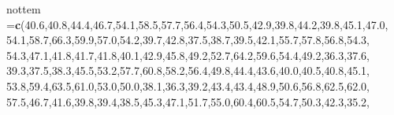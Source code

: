 \documentclass[
]{book}
\newenvironment{Shaded}{\begin{snugshade}}{\end{snugshade}}
\newcommand{\FloatTok}[1]{\textcolor[rgb]{0.00,0.00,0.81}{#1}}
\newcommand{\FunctionTok}[1]{\textcolor[rgb]{0.13,0.29,0.53}{\textbf{#1}}}
\newcommand{\NormalTok}[1]{#1}
\newcommand{\OtherTok}[1]{\textcolor[rgb]{0.56,0.35,0.01}{#1}}
\begin{document}
\begin{Shaded}
\begin{Highlighting}[]
\NormalTok{nottem }\OtherTok{=}\FunctionTok{c}\NormalTok{(}\FloatTok{40.6}\NormalTok{,}\FloatTok{40.8}\NormalTok{,}\FloatTok{44.4}\NormalTok{,}\FloatTok{46.7}\NormalTok{,}\FloatTok{54.1}\NormalTok{,}\FloatTok{58.5}\NormalTok{,}\FloatTok{57.7}\NormalTok{,}\FloatTok{56.4}\NormalTok{,}\FloatTok{54.3}\NormalTok{,}\FloatTok{50.5}\NormalTok{,}\FloatTok{42.9}\NormalTok{,}\FloatTok{39.8}\NormalTok{,}\FloatTok{44.2}\NormalTok{,}\FloatTok{39.8}\NormalTok{,}\FloatTok{45.1}\NormalTok{,}\FloatTok{47.0}\NormalTok{,}
          \FloatTok{54.1}\NormalTok{,}\FloatTok{58.7}\NormalTok{,}\FloatTok{66.3}\NormalTok{,}\FloatTok{59.9}\NormalTok{,}\FloatTok{57.0}\NormalTok{,}\FloatTok{54.2}\NormalTok{,}\FloatTok{39.7}\NormalTok{,}\FloatTok{42.8}\NormalTok{,}\FloatTok{37.5}\NormalTok{,}\FloatTok{38.7}\NormalTok{,}\FloatTok{39.5}\NormalTok{,}\FloatTok{42.1}\NormalTok{,}\FloatTok{55.7}\NormalTok{,}\FloatTok{57.8}\NormalTok{,}\FloatTok{56.8}\NormalTok{,}\FloatTok{54.3}\NormalTok{,}
          \FloatTok{54.3}\NormalTok{,}\FloatTok{47.1}\NormalTok{,}\FloatTok{41.8}\NormalTok{,}\FloatTok{41.7}\NormalTok{,}\FloatTok{41.8}\NormalTok{,}\FloatTok{40.1}\NormalTok{,}\FloatTok{42.9}\NormalTok{,}\FloatTok{45.8}\NormalTok{,}\FloatTok{49.2}\NormalTok{,}\FloatTok{52.7}\NormalTok{,}\FloatTok{64.2}\NormalTok{,}\FloatTok{59.6}\NormalTok{,}\FloatTok{54.4}\NormalTok{,}\FloatTok{49.2}\NormalTok{,}\FloatTok{36.3}\NormalTok{,}\FloatTok{37.6}\NormalTok{,}
          \FloatTok{39.3}\NormalTok{,}\FloatTok{37.5}\NormalTok{,}\FloatTok{38.3}\NormalTok{,}\FloatTok{45.5}\NormalTok{,}\FloatTok{53.2}\NormalTok{,}\FloatTok{57.7}\NormalTok{,}\FloatTok{60.8}\NormalTok{,}\FloatTok{58.2}\NormalTok{,}\FloatTok{56.4}\NormalTok{,}\FloatTok{49.8}\NormalTok{,}\FloatTok{44.4}\NormalTok{,}\FloatTok{43.6}\NormalTok{,}\FloatTok{40.0}\NormalTok{,}\FloatTok{40.5}\NormalTok{,}\FloatTok{40.8}\NormalTok{,}\FloatTok{45.1}\NormalTok{,}
          \FloatTok{53.8}\NormalTok{,}\FloatTok{59.4}\NormalTok{,}\FloatTok{63.5}\NormalTok{,}\FloatTok{61.0}\NormalTok{,}\FloatTok{53.0}\NormalTok{,}\FloatTok{50.0}\NormalTok{,}\FloatTok{38.1}\NormalTok{,}\FloatTok{36.3}\NormalTok{,}\FloatTok{39.2}\NormalTok{,}\FloatTok{43.4}\NormalTok{,}\FloatTok{43.4}\NormalTok{,}\FloatTok{48.9}\NormalTok{,}\FloatTok{50.6}\NormalTok{,}\FloatTok{56.8}\NormalTok{,}\FloatTok{62.5}\NormalTok{,}\FloatTok{62.0}\NormalTok{,}
          \FloatTok{57.5}\NormalTok{,}\FloatTok{46.7}\NormalTok{,}\FloatTok{41.6}\NormalTok{,}\FloatTok{39.8}\NormalTok{,}\FloatTok{39.4}\NormalTok{,}\FloatTok{38.5}\NormalTok{,}\FloatTok{45.3}\NormalTok{,}\FloatTok{47.1}\NormalTok{,}\FloatTok{51.7}\NormalTok{,}\FloatTok{55.0}\NormalTok{,}\FloatTok{60.4}\NormalTok{,}\FloatTok{60.5}\NormalTok{,}\FloatTok{54.7}\NormalTok{,}\FloatTok{50.3}\NormalTok{,}\FloatTok{42.3}\NormalTok{,}\FloatTok{35.2}\NormalTok{,}

\end{Highlighting}
\end{Shaded}
\end{document}
